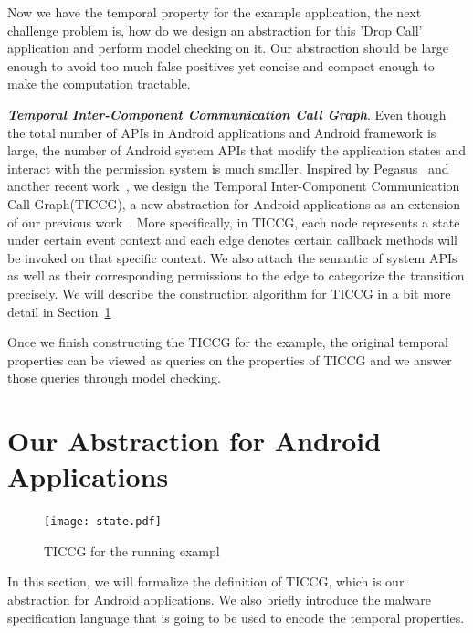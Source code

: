 \documentclass{article}
\begin{document}
Now we have the temporal property for the example application, the next 
challenge problem is, how do we design an abstraction for this 'Drop Call' 
application and perform model checking on it. Our abstraction should be large
enough to avoid too much false positives yet concise and compact enough 
to make the computation tractable.


{\bf \emph{Temporal Inter-Component Communication Call Graph}}. Even though
the total number of APIs in Android applications and Android framework is large,
the number of Android system APIs that modify the application states and 
interact with the permission system is much smaller. Inspired by Pegasus~\cite{pegasus} 
and another recent work~\cite{aware14}, we design the Temporal Inter-Component
 Communication Call Graph(TICCG), a new abstraction for 
Android applications as an extension of our previous work~\cite{apposcopy}.
More specifically, in TICCG, each node represents a state under certain
event context and each edge denotes certain callback methods will be invoked 
on that specific context. We also attach the semantic of system APIs 
as well as their corresponding permissions to the edge to categorize 
the transition precisely. We will describe the construction algorithm for 
TICCG in a bit more detail in Section~\ref{sec:ticcg} 

Once we finish constructing the TICCG for the example, the original temporal
properties can be viewed as queries on the properties of TICCG and we answer those
queries through model checking.  

\section{Our Abstraction for Android Applications}
\label{sec:ticcg}

\begin{figure}[ht!]
\centering
\texttt{[image: state.pdf]}
\caption{TICCG for the running exampl\label{state}}
\end{figure}

In this section, we will formalize the definition of TICCG, which is our abstraction
for Android applications. We also briefly introduce the malware specification language
that is going to be used to encode the temporal properties.
\end{document}
